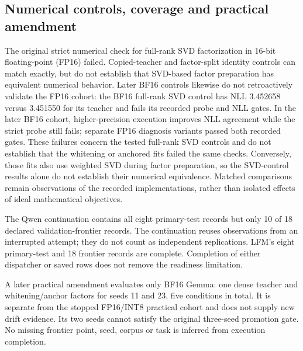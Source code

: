 \documentclass[conference]{IEEEtran}
\begin{document}
\subsection{Numerical controls, coverage and practical amendment}
The original strict numerical check for full-rank SVD factorization in 16-bit floating-point (FP16) failed. Copied-teacher and factor-split identity controls can match exactly, but do not establish that SVD-based factor preparation has equivalent numerical behavior. Later BF16 controls likewise do not retroactively validate the FP16 cohort: the BF16 full-rank SVD control has NLL 3.452658 versus 3.451550 for its teacher and fails its recorded probe and NLL gates. In the later BF16 cohort, higher-precision execution improves NLL agreement while the strict probe still fails; separate FP16 diagnosis variants passed both recorded gates. These failures concern the tested full-rank SVD controls and do not establish that the whitening or anchored fits failed the same checks. Conversely, those fits also use weighted SVD during factor preparation, so the SVD-control results alone do not establish their numerical equivalence. Matched comparisons remain observations of the recorded implementations, rather than isolated effects of ideal mathematical objectives.\par\smallskip
The Qwen continuation contains all eight primary-test records but only 10 of 18 declared validation-frontier records. The continuation reuses observations from an interrupted attempt; they do not count as independent replications. LFM's eight primary-test and 18 frontier records are complete. Completion of either dispatcher or saved rows does not remove the readiness limitation.\par\smallskip
A later practical amendment evaluates only BF16 Gemma: one dense teacher and whitening/anchor factors for seeds 11 and 23, five conditions in total. It is separate from the stopped FP16/INT8 practical cohort and does not supply new drift evidence. Its two seeds cannot satisfy the original three-seed promotion gate. No missing frontier point, seed, corpus or task is inferred from execution completion.\par\smallskip
\end{document}
